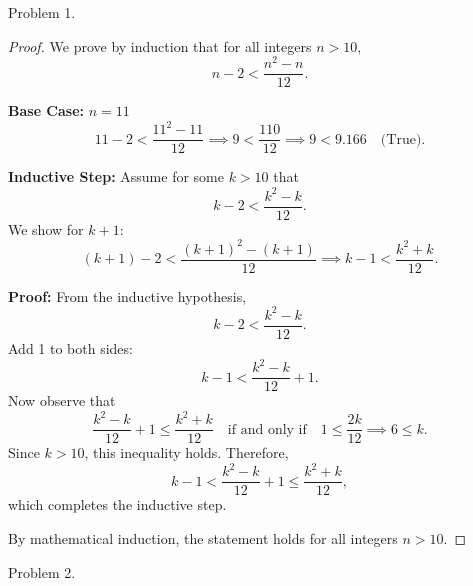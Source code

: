 \documentclass{article}
\begin{document}
Problem 1.

\begin{proof}
We prove by induction that for all integers $n > 10$, 
\[
n - 2 < \frac{n^2 - n}{12}.
\]

\textbf{Base Case: } $n = 11$
\[
11 - 2 < \frac{11^2 - 11}{12} \implies 9 < \frac{110}{12} \implies 9 < 9.166\quad \text{(True)}.
\]

\textbf{Inductive Step: } Assume for some $k > 10$ that
\[
k - 2 < \frac{k^2 - k}{12}.
\]
We show for $k + 1$:
\[
(k + 1) - 2 < \frac{(k + 1)^2 - (k + 1)}{12} \implies k - 1 < \frac{k^2 + k}{12}.
\]

\textbf{Proof: } From the inductive hypothesis,
\[
k - 2 < \frac{k^2 - k}{12}.
\]
Add 1 to both sides:
\[
k - 1 < \frac{k^2 - k}{12} + 1.
\]
Now observe that
\[
\frac{k^2 - k}{12} + 1 \leq \frac{k^2 + k}{12} \quad \text{if and only if} \quad 1 \leq \frac{2k}{12} \implies 6 \leq k.
\]
Since $k > 10$, this inequality holds. Therefore,
\[
k - 1 < \frac{k^2 - k}{12} + 1 \leq \frac{k^2 + k}{12},
\]
which completes the inductive step.

By mathematical induction, the statement holds for all integers $n > 10$.

\end{proof}

Problem 2.
\end{document}

